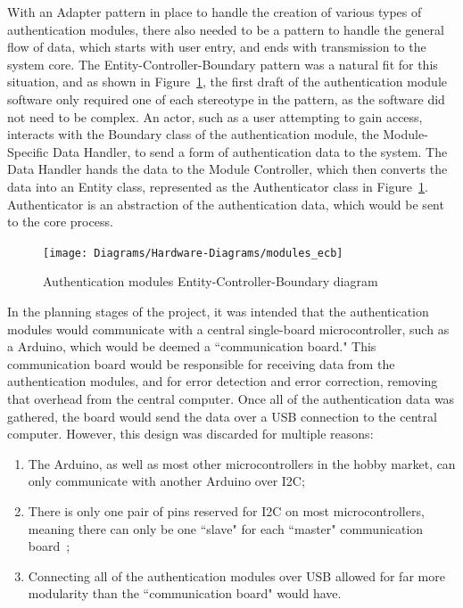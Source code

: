 \documentclass[12pt]{report}
\begin{document}
With an Adapter pattern in place to handle the creation of various types of authentication modules, there also needed to 
be a pattern to handle the general flow of data, which starts with user entry, and ends with transmission to the system
core. The Entity-Controller-Boundary pattern was a natural fit for this situation, and as shown in 
Figure~\ref{fig:modules-ecb}, the first draft of the authentication module software only required one of each 
stereotype in the pattern, as the software did not need to be complex. An actor, such as a user attempting to gain 
access, interacts with the Boundary class of the authentication module, the Module-Specific Data Handler, to send a 
form of authentication data to the system. The Data Handler hands the data to the Module Controller, which then 
converts the data into an Entity class, represented as the Authenticator class in Figure~\ref{fig:modules-ecb}. 
Authenticator is an abstraction of the authentication data, which would be sent to the core process.

\begin{figure}
    \texttt{[image: Diagrams/Hardware-Diagrams/modules\_ecb]}
    \caption{Authentication modules Entity-Controller-Boundary diagram}
    \label{fig:modules-ecb}
\end{figure}

In the planning stages of the project, it was intended that the authentication modules would communicate with a central 
single-board microcontroller, such as a Arduino, which would be deemed a ``communication board." This communication board
would be responsible for receiving data from the authentication modules, and for error detection and error correction, 
removing that overhead from the central computer. Once all of the authentication data was gathered, the board would send 
the data over a USB connection to the central computer. However, this design was discarded for multiple reasons:
\begin{enumerate}
    \item The Arduino, as well as most other microcontrollers in the hobby market, can only communicate with another 
    Arduino over I2C;
    \item There is only one pair of pins reserved for I2C on most microcontrollers, meaning there can only be one 
    ``slave" for each ``master" communication board~\autocite{ARDUINOPINOUT};
    \item Connecting all of the authentication modules over USB allowed for far more modularity than the ``communication
    board" would have.
\end{enumerate}
\end{document}
